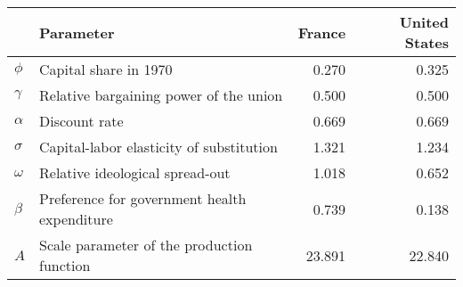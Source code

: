 
\begin{tabular}{llrr}
\toprule
\textbf{} & \textbf{Parameter} & \textbf{France} & \textbf{United States}\\
\midrule
$\phi$ & Capital share in 1970 & 0.270 & 0.325\\
$\gamma$ & Relative bargaining power of the union & 0.500 & 0.500\\
$\alpha$ & Discount rate & 0.669 & 0.669\\
$\sigma$ & Capital-labor elasticity of substitution & 1.321 & 1.234\\
$\omega$ & Relative ideological spread-out & 1.018 & 0.652\\
$\beta$ & Preference for government health expenditure & 0.739 & 0.138\\
$A$ & Scale parameter of the production function & 23.891 & 22.840\\
\bottomrule
\end{tabular}
